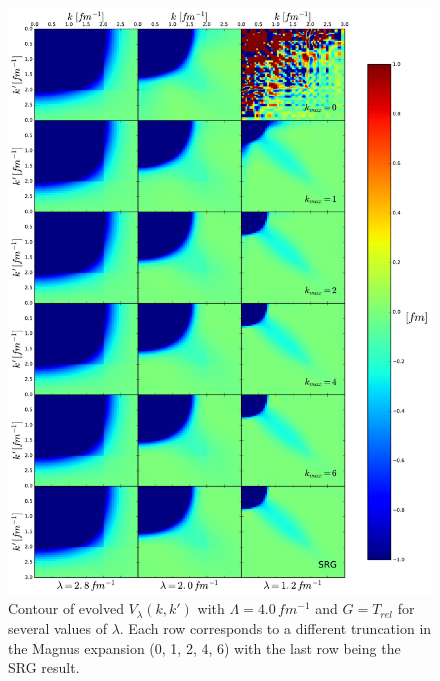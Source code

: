 \documentclass[preprintnumbers,floatfix,aps,prc,preprint]{revtex4-1}
\begin{document}
%
\begin{figure}[H]
  \centering
  \includegraphics[width=15cm]{mag_contours_RKE_4_Wilson}
   \hspace*{0.05\textwidth}%
  \caption{Contour of evolved $V_{\lambda}(k,k')$ with $\Lambda=4.0\,fm^{-1}$ and $G=T_{rel}$ for several values of $\lambda$. Each row corresponds to a different truncation in the Magnus expansion (0, 1, 2, 4, 6) with the last row being the SRG result.}
  \label{fig:mag_contours_RKE_4_Wilson}
\end{figure}
%
\end{document}
